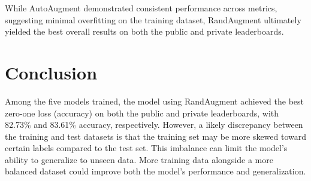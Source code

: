 \documentclass[letterpaper]{article}
\begin{document}
    While AutoAugment demonstrated consistent performance across metrics, suggesting minimal overfitting on the training dataset, RandAugment ultimately yielded the best overall results on both the public and private leaderboards.
    
    \begin{table}[h!]
        \centering
        \caption{Model Accuracies Using Different Auto-Augmentation Techniques}
        \label{tab:model_accuracies}
    \end{table}

\section{Conclusion}

    Among the five models trained, the model using RandAugment achieved the best zero-one loss (accuracy) on both the public and private leaderboards, with 82.73\% and 83.61\% accuracy, respectively. However, a likely discrepancy between the training and test datasets is that the training set may be more skewed toward certain labels compared to the test set. This imbalance can limit the model's ability to generalize to unseen data. More training data alongside a more balanced dataset could improve both the model's performance and generalization.
\end{document}
